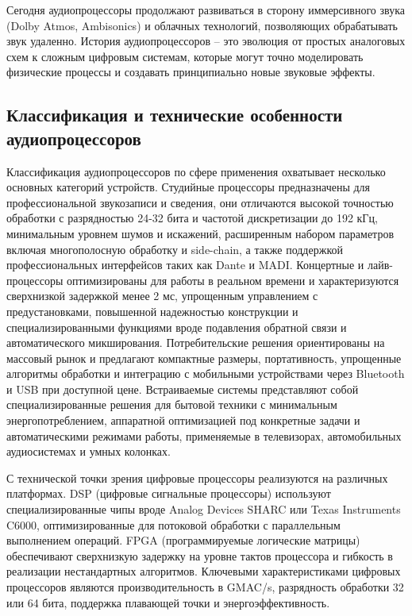 Сегодня аудиопроцессоры продолжают развиваться в сторону иммерсивного звука (Dolby Atmos, Ambisonics) и облачных технологий, позволяющих обрабатывать звук удаленно. История аудиопроцессоров – это эволюция от простых аналоговых схем к сложным цифровым системам, которые могут точно моделировать физические процессы и создавать принципиально новые звуковые эффекты.

\subsection{Классификация и технические особенности аудиопроцессоров}
Классификация аудиопроцессоров по сфере применения охватывает несколько основных категорий устройств. Студийные процессоры предназначены для профессиональной звукозаписи и сведения, они отличаются высокой точностью обработки с разрядностью 24-32 бита и частотой дискретизации до 192 кГц, минимальным уровнем шумов и искажений, расширенным набором параметров включая многополосную обработку и side-chain, а также поддержкой профессиональных интерфейсов таких как Dante и MADI. Концертные и лайв-процессоры оптимизированы для работы в реальном времени и характеризуются сверхнизкой задержкой менее 2 мс, упрощенным управлением с предустановками, повышенной надежностью конструкции и специализированными функциями вроде подавления обратной связи и автоматического микширования. Потребительские решения ориентированы на массовый рынок и предлагают компактные размеры, портативность, упрощенные алгоритмы обработки и интеграцию с мобильными устройствами через Bluetooth и USB при доступной цене. Встраиваемые системы представляют собой специализированные решения для бытовой техники с минимальным энергопотреблением, аппаратной оптимизацией под конкретные задачи и автоматическими режимами работы, применяемые в телевизорах, автомобильных аудиосистемах и умных колонках.

С технической точки зрения цифровые процессоры реализуются на различных платформах. DSP (цифровые сигнальные процессоры) используют специализированные чипы вроде Analog Devices SHARC или Texas Instruments C6000, оптимизированные для потоковой обработки с параллельным выполнением операций. FPGA (программируемые логические матрицы) обеспечивают сверхнизкую задержку на уровне тактов процессора и гибкость в реализации нестандартных алгоритмов. Ключевыми характеристиками цифровых процессоров являются производительность в GMAC/s, разрядность обработки 32 или 64 бита, поддержка плавающей точки и энергоэффективность.

